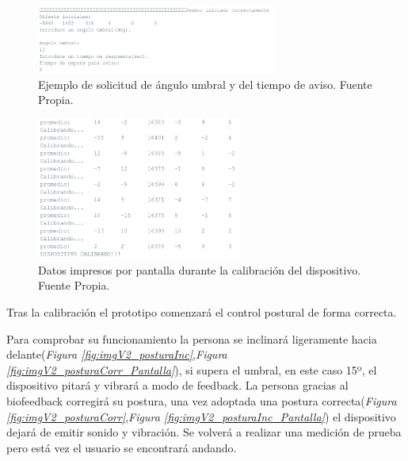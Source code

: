 \begin{figure}[h!]
    \centering
    \includegraphics[width=0.7\textwidth]{img/EleccionAngTiempo.png}
    \caption{Ejemplo de solicitud de ángulo umbral y del tiempo de aviso. Fuente Propia.}
    \label{fig:imgAnguloTiempo} 
\end{figure}

\begin{figure}[h!]
    \centering
    \includegraphics[width=0.6\textwidth]{img/Calibracion.png}
    \caption{Datos impresos por pantalla durante la calibración del dispositivo. Fuente Propia.}
    \label{fig:imgCalibracion} 
\end{figure}

Tras la calibración el prototipo comenzará el control postural de forma correcta.

Para comprobar su funcionamiento la persona se inclinará ligeramente hacia delante(\textit{Figura \ref{fig:imgV2_posturaInc}},\textit{Figura \ref{fig:imgV2_posturaCorr_Pantalla}}), si supera el umbral, en este caso 15º, el dispositivo pitará y vibrará a modo de feedback. La persona gracias al biofeedback corregirá su postura, una vez adoptada una postura correcta(\textit{Figura \ref{fig:imgV2_posturaCorr}},\textit{Figura \ref{fig:imgV2_posturaInc_Pantalla}}) el dispositivo dejará de emitir sonido y vibración. Se volverá a realizar una medición de prueba pero está vez el usuario se encontrará andando.


